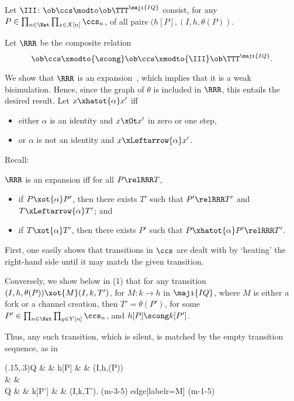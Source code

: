\documentclass{LMCS}
\renewcommand{\QFI}{\maji{IQ}}
\renewcommand{\LLL}{\QFI}
\renewcommand{\TTTL}{\TTT^{\LLL}}
\theoremstyle{plain}\newtheorem{satz}[thm]{Satz}
\begin{document}
\begin{defi}
  Let $\III \colon \ob \ccs \modto \ob\TTTL$ consist, for any $P \in
  \prod_{n \in \Nat} \prod_{x \in X[n]} \ccs_n$, of all pairs
  $(h[P],(I,h,\theta(P))$.
\end{defi}

  Let $\RRR$ be the composite relation
  $$\ob\ccs \xmodto{\scong} \ob\ccs \xmodto{\III} \ob\TTTL.$$

  We show that $\RRR$ is an expansion~\cite[Chapter 6]{SangioRutten}, which implies
  that it is a weak bisimulation.  Hence, since the graph of $\theta$
  is included in $\RRR$, this entails the desired result.  Let $x
  \xhatot{\alpha} x'$ iff
  \begin{itemize}
  \item either $\alpha$ is an identity and $x \xOt x'$ in zero or one step,
  \item or $\alpha$ is not an identity and $x \xLeftarrow{\alpha} x'$.
  \end{itemize}
  Recall:
  \begin{defi}
    $\RRR$ is an expansion iff for all $P \relRRR T$,
    \begin{itemize}
    \item if $P \xot{\alpha} P'$, then there exists $T'$ such
      that $P' \relRRR T'$ and $T \xLeftarrow{\alpha} T'$; and
    \item if $T \xot{\alpha} T'$, then there exists $P'$ such that
      $P \xhatot{\alpha} P' \relRRR T'$.
    \end{itemize}
  \end{defi}

  First, one easily shows that transitions in $\ccs$ are dealt with by
  `heating' the right-hand side until it may match the given
  transition.


  Conversely, we show below in (1) that for any transition
  $(I,h,\theta(P)) \xot{M} (I,k,T')$, for $M \colon k \to h$ in
  $\LLL$, where $M$ is either a fork or a channel creation, then $T' =
  \theta(P')$, for some $P' \in \prod_{n \in \Nat} \prod_{y \in Y[n]}
  \ccs_n$, and $h[P] \scong k[P']$.

  Thus, any such transition, which is silent, is matched by the empty
  transition sequence, as in

\begin{center}
  \diag(.15,.3){Q \& \scong \& h[P] \& \III \& (I,h,\theta(P)) \\
    \mbox{} \& \& \mbox{} \\
    Q \& \scong \& k[P'] \& \III \& (I,k,T'). }{(m-3-5) edge[labelr={M}] (m-1-5) }
\end{center}
\end{document}
